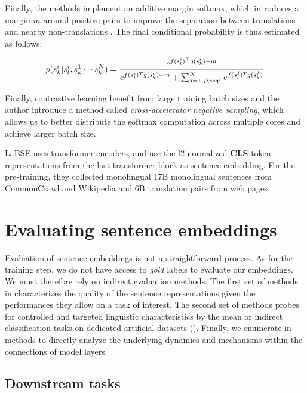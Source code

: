 Finally, the methods implement an additive margin softmax, which introduces a margin $m$ around positive pairs to improve the separation between translations and nearby non-translations \parencite{yang_19}. The final conditional probability is thus estimated as follows:

\begin{equation*}
    p(s^i_k | s^i_l, s^1_k \cdots s^N_k) = \frac{e^{f(s^i_l)^{\top}g(s^i_k) -m}}{e^{f(s^i_l)^Tg(s^i_k)-m}+\sum_{j=1, j\neqi}^Ne^{f(s^j_l)^Tg(s^j_k)}}    
\end{equation*}

Finally, contrastive learning benefit from large training batch sizes \parencite{guo_18, chen_20a, qu_21} and the author introduce a method called \textit{cross-accelerator negative sampling}, which allows us to better distribute the softmax computation across multiple cores and achieve larger batch size.

LaBSE uses transformer encoders, and use the l2 normalized \textbf{CLS} token representations from the last transformer block as sentence embedding. For the pre-training, they collected monolingual 17B monolingual sentences from CommonCrawl and Wikipedia and 6B translation pairs from web pages.

\section{Evaluating sentence embeddings}

Evaluation of sentence embeddings is not a straightforward process. As for the training step, we do not have access to \textit{gold} labels to evaluate our embeddings. We must therefore rely on indirect evaluation methods. The first set of methods in  characterizes the quality of the sentence representations given the performances they allow on a task of interest. The second set of methods probes for controlled and targeted linguistic characteristics by the mean or indirect classification tasks on dedicated artificial datasets (). Finally, we enumerate in  methods to directly analyze the underlying dynamics and mechanisms within the connections of model layers.

\subsection{Downstream tasks}

